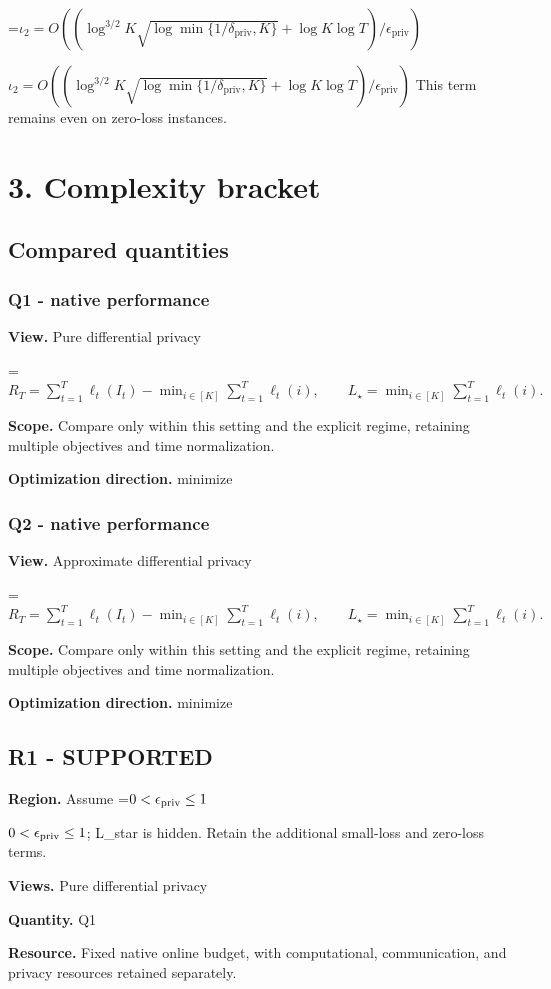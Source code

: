 \documentclass[10pt,a4paper]{article}
\newcommand{\AtlasMath}[1]{\par\begingroup\centering\setbox0=\hbox{$\displaystyle #1$}\ifdim\wd0>1.4\linewidth\typeout{ATLAS WIDE FORMULA: \the\wd0}\fi\ifdim\wd0>\linewidth\resizebox{\linewidth}{!}{\box0}\else\box0\fi\par\endgroup}
\newcommand{\AtlasInlineMath}[1]{\begingroup\setbox0=\hbox{$#1$}\ifdim\wd0>.4\linewidth\endgroup\AtlasMath{#1}\else\endgroup$#1$\fi}
\begin{document}
\AtlasInlineMath{\iota_2=O((\log^{3/2}K\sqrt{\log\min\{1/\delta_{\mathrm{priv}},K\}}+\log K\log T)/\epsilon_{\mathrm{priv}})} This term remains even on zero-loss instances.

\section{3. Complexity bracket}
\subsection{Compared quantities}
\subsubsection{Q1 - native performance}
\textbf{View.} Pure differential privacy

\AtlasMath{R_T=\sum_{t=1}^T\ell_t(I_t)-\min_{i\in[K]}\sum_{t=1}^T\ell_t(i),\qquad L_\star=\min_{i\in[K]}\sum_{t=1}^T\ell_t(i).}
\textbf{Scope.} Compare only within this setting and the explicit regime, retaining multiple objectives and time normalization.

\textbf{Optimization direction.} minimize

\subsubsection{Q2 - native performance}
\textbf{View.} Approximate differential privacy

\AtlasMath{R_T=\sum_{t=1}^T\ell_t(I_t)-\min_{i\in[K]}\sum_{t=1}^T\ell_t(i),\qquad L_\star=\min_{i\in[K]}\sum_{t=1}^T\ell_t(i).}
\textbf{Scope.} Compare only within this setting and the explicit regime, retaining multiple objectives and time normalization.

\textbf{Optimization direction.} minimize

\subsection{R1 - SUPPORTED}
\textbf{Region.} Assume \AtlasInlineMath{0<\epsilon_{\rm priv}\le 1}; L\_star is hidden. Retain the additional small-loss and zero-loss terms.

\textbf{Views.} Pure differential privacy

\textbf{Quantity.} Q1

\textbf{Resource.} Fixed native online budget, with computational, communication, and privacy resources retained separately.
\end{document}

